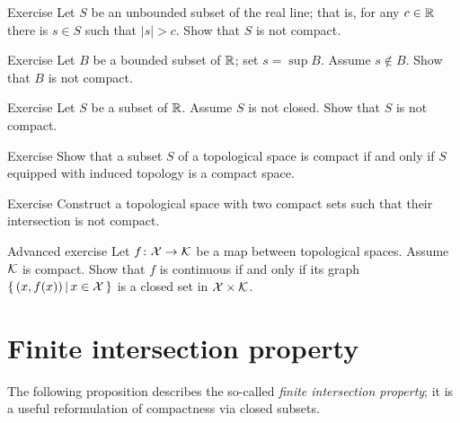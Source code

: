 \begin{thm}{Exercise}
Let $S$ be an unbounded subset of the real line; that is, for any $c\in \mathbb{R}$ there is $s\in S$ such that $|s|>c$.
Show that $S$ is not compact.

\end{thm}

\begin{thm}{Exercise}
Let $B$ be a bounded subset of $\mathbb{R}$; set $s=\sup B$.
Assume $s\notin B$.
Show that $B$ is not compact.

\end{thm}

\begin{thm}{Exercise}\label{ex:closed-compact}
Let $S$ be a subset of $\mathbb{R}$.
Assume $S$ is not closed.
Show that $S$ is not compact.

\end{thm}

\begin{thm}{Exercise}
Show that a subset $S$ of a topological space is compact if and only if $S$ equipped with induced topology is a compact space.
\end{thm}

\begin{thm}{Exercise}
Construct a topological space with two compact sets such that their intersection is not compact.
\end{thm}

\begin{thm}{Advanced exercise} Let $f\colon\mathcal{X}\to\mathcal{K}$ be a map between topological spaces.
Assume $\mathcal{K}$ is compact.
Show that $f$ is continuous if and only if its graph $\left\{\,{(x,f(x))}\,\middle|\,{x\in\mathcal{X}}\,\right\}$ is a closed set in $\mathcal{X}\times\mathcal{K}$. 
\end{thm}

\section{Finite intersection property}

The following proposition describes the so-called \emph{finite intersection property};
it is a useful reformulation of compactness via closed subsets. 

